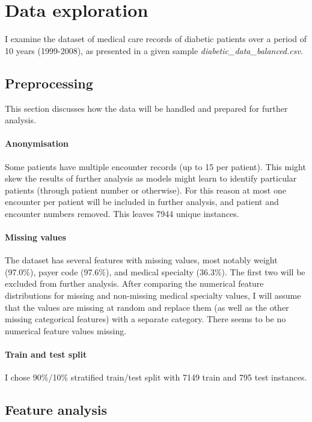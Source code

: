 \documentclass[11pt, twocolumn]{article}
\begin{document}
\thispagestyle{first}
\pagestyle{plain}


\section{Data exploration}

I examine the dataset of medical care records of diabetic patients over a period of 10 years (1999-2008), as presented in a given sample \textit{diabetic\_data\_balanced.csv}. 

\subsection{Preprocessing}
This section discusses how the data will be handled and prepared for further analysis.

\paragraph{Anonymisation} Some patients have multiple encounter records (up to 15 per patient). This might skew the results of further analysis as models might learn to identify particular patients (through patient number or otherwise). For this reason at most one encounter per patient will be included in further analysis, and patient and encounter numbers removed. This leaves 7944 unique instances.

\paragraph{Missing values} The dataset has several features with missing values, most notably weight (97.0\%), payer code (97.6\%), and medical specialty (36.3\%). The first two will be excluded from further analysis. After comparing the numerical feature distributions for missing and non-missing medical specialty values, I will assume that the values are missing at random and replace them (as well as the other missing categorical features) with a separate category. There seems to be no numerical feature values missing.

\paragraph{Train and test split} I chose 90\%/10\% stratified train/test split with 7149 train and 795 test instances.

\subsection{Feature analysis}




\newpage
\clearpage
\end{document}
